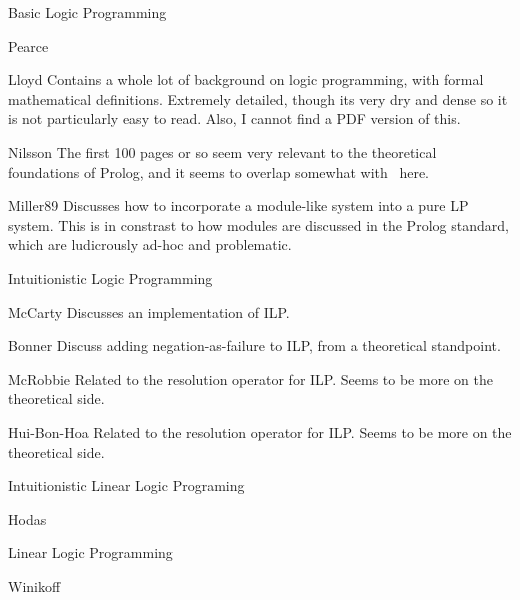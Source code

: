 \begin{pgroup}{Basic Logic Programming}
  \begin{paper}{Pearce}
    \mustread
  \end{paper}

  \begin{paper}{Lloyd}
    Contains a whole lot of background on logic programming, with formal mathematical definitions.
    Extremely detailed, though its very dry and dense so it is not particularly easy to read.
    Also, I cannot find a PDF version of this.

    \mustread
  \end{paper}

  \begin{paper}{Nilsson}
    The first 100 pages or so seem very relevant to the theoretical foundations of Prolog, and it seems to overlap somewhat with~\cite{Lloyd} here.

    \mustread
  \end{paper}

  \begin{paper}{Miller89}
    Discusses how to incorporate a module-like system into a pure LP system.
    This is in constrast to how modules are discussed in the Prolog standard, which are ludicrously ad-hoc and problematic.
    \mustread
  \end{paper}
\end{pgroup}

\begin{pgroup}{Intuitionistic Logic Programming}
  \begin{paper}{McCarty}
    Discusses an implementation of ILP.
    \mustread
  \end{paper}

  \begin{paper}{Bonner}
    Discuss adding negation-as-failure to ILP, from a theoretical standpoint.
    \mustread
  \end{paper}

  \begin{paper}{McRobbie}
    Related to the resolution operator for ILP.
    Seems to be more on the theoretical side.
    \mustread
  \end{paper}

  \begin{paper}{Hui-Bon-Hoa}
    Related to the resolution operator for ILP.
    Seems to be more on the theoretical side.
    \mustread
  \end{paper}
\end{pgroup}

\begin{pgroup}{Intuitionistic Linear Logic Programing}
  \begin{paper}{Hodas}
    \mustread
  \end{paper}
\end{pgroup}

\begin{pgroup}{Linear Logic Programming}
  \begin{paper}{Winikoff}
    \mustread
  \end{paper}
\end{pgroup}
